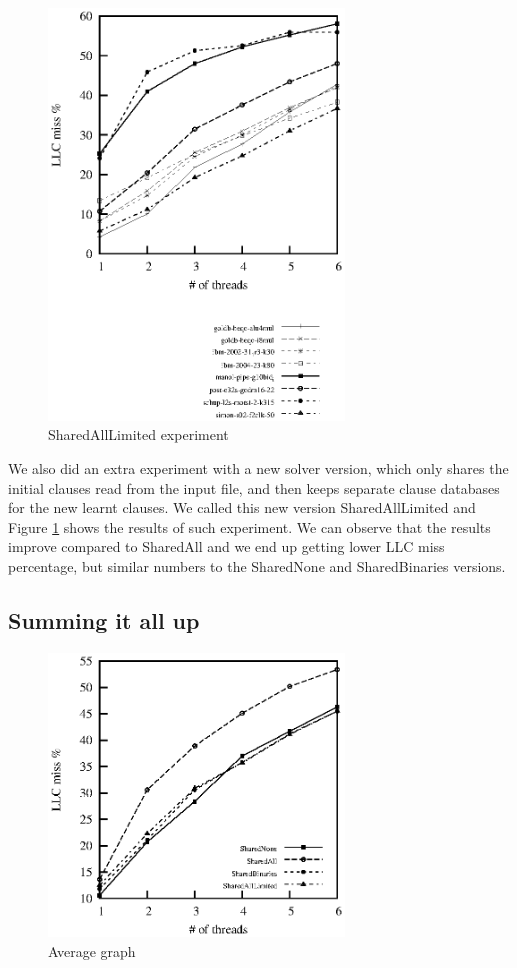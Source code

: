 \documentclass[12pt]{diicc}
\begin{document}
\begin{figure}[h!]
	\centering
		\includegraphics[width=0.7\textwidth]{shared-all-start}
	\caption{SharedAllLimited experiment}
	\label{fig:shared-all-start}
\end{figure}

We also did an extra experiment with a new solver version, which only shares the initial clauses read from the input file, and then keeps separate clause databases for the new learnt clauses. We called this new version SharedAllLimited and Figure \ref{fig:shared-all-start} shows the results of such experiment. We can observe that the results improve compared to SharedAll and we end up getting lower LLC miss percentage, but similar numbers to the SharedNone and SharedBinaries versions.

\subsection{Summing it all up}

\begin{figure}[h!]
	\centering
		\includegraphics[width=0.7\textwidth]{average}
	\caption{Average graph}
	\label{fig:average}
\end{figure}
\end{document}
